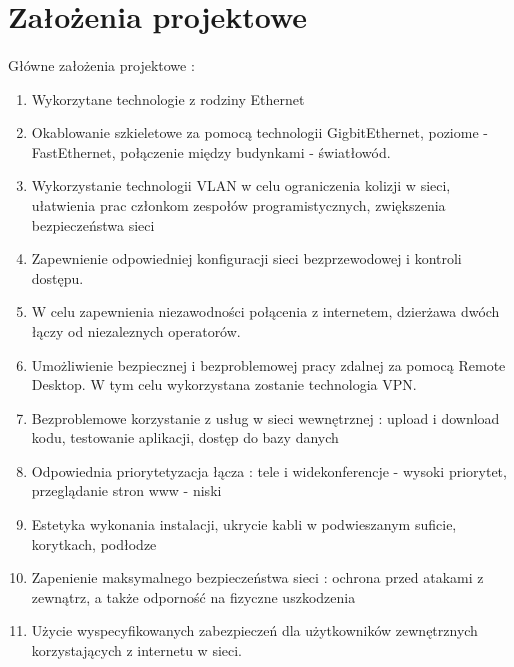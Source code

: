 \section{Założenia projektowe}
\paragraph{}
Główne założenia projektowe :
\begin{enumerate}
	\item Wykorzytane technologie z rodziny Ethernet
	\item Okablowanie szkieletowe za pomocą technologii GigbitEthernet, poziome - FastEthernet, połączenie między budynkami - światłowód.
	\item Wykorzystanie technologii VLAN w celu ograniczenia kolizji  w sieci, ułatwienia prac członkom zespołów programistycznych, zwiększenia bezpieczeństwa sieci
	\item Zapewnienie odpowiedniej konfiguracji sieci bezprzewodowej i kontroli dostępu.
	\item W celu zapewnienia niezawodności połącenia z internetem, dzierżawa dwóch łączy od niezaleznych operatorów.
	\item Umożliwienie bezpiecznej i bezproblemowej pracy zdalnej za pomocą Remote Desktop. W tym celu wykorzystana zostanie technologia VPN.
	\item Bezproblemowe korzystanie z usług w sieci wewnętrznej : upload i download kodu, testowanie aplikacji, dostęp do bazy danych
	\item Odpowiednia priorytetyzacja łącza : tele i widekonferencje - wysoki priorytet, przeglądanie stron www - niski
	\item Estetyka wykonania instalacji, ukrycie kabli w podwieszanym suficie, korytkach, podłodze
	\item Zapenienie maksymalnego bezpieczeństwa sieci : ochrona przed atakami z zewnątrz, a także odporność na fizyczne uszkodzenia
	\item Użycie wyspecyfikowanych zabezpieczeń dla użytkowników zewnętrznych korzystających z internetu w sieci.
\end{enumerate}
